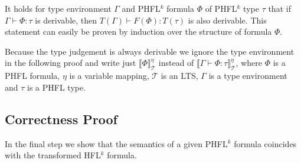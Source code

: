 \begin{remark}
    It holds for type environment $\Gamma$ and PHFL$^k$ formula $\Phi$ of PHFL$^k$ type $\tau$ that if $\Gamma \vdash
    \Phi \colon \tau$ is derivable, then $T(\Gamma) \vdash F(\Phi) \colon T(\tau)$ is also derivable. This statement
    can easily be proven by induction over the structure of formula $\Phi$.
\end{remark}

Because the type judgement is always derivable we ignore the type environment in the following proof and write just $\llbracket \Phi \rrbracket^\eta_\mathcal{T}$ instead of $\llbracket \Gamma \vdash \Phi \colon \tau \rrbracket^\eta_\mathcal{T}$, where $\Phi$ is a PHFL formula, $\eta$ is a variable mapping, $\mathcal{T}$ is an LTS, $\Gamma$ is a type environment and $\tau$ is a PHFL type. 

\subsection{Correctness Proof}
In the final step we show that the semantics of a given PHFL$^k$ formula coincides with the transformed HFL$^k$ formula.

